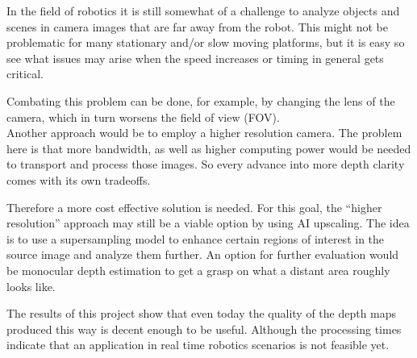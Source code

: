 In the field of robotics it is still somewhat of a challenge to analyze objects and scenes in camera images that are far away from the robot.
This might not be problematic for many stationary and/or slow moving platforms, but it is easy so see what issues may arise when the speed increases or timing in general gets critical.

Combating this problem can be done, for example, by changing the lens of the camera, which in turn worsens the field of view (FOV). \\
Another approach would be to employ a higher resolution camera. The problem here is that more bandwidth, as well as higher computing power would be needed to transport and process those images.
So every advance into more depth clarity comes with its own tradeoffs.

Therefore a more cost effective solution is needed. For this goal, the \enquote{higher resolution} approach may still be a viable option by using AI upscaling.
The idea is to use a supersampling model to enhance certain regions of interest in the source image and analyze them further.
An option for further evaluation would be monocular depth estimation to get a grasp on what a distant area roughly looks like.

The results of this project show that even today the quality of the depth maps produced this way is decent enough to be useful. Although the processing times indicate that an application in real time robotics scenarios is not feasible yet.